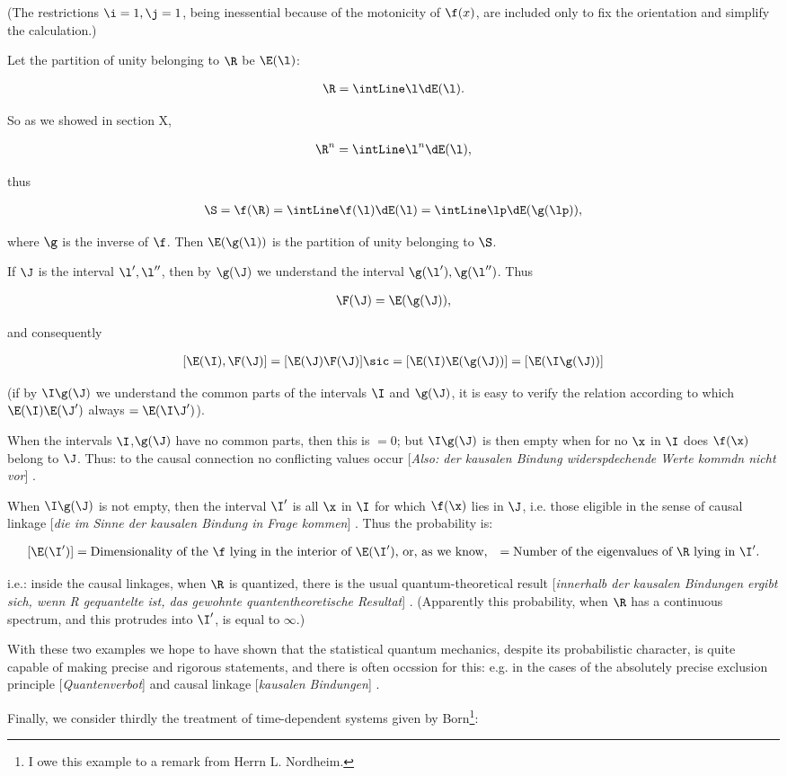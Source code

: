 \documentclass{article}
\newcommand{\WTF}[1]{
[\it{\small{#1}}]
}
\newcommand{\uequ}[1]{
\begin{align*}
#1
\end{align*}
}
\renewcommand{\it}[1]{\textit{#1}}
\begin{document}
(The restrictions $\i=1,\j=1$, being inessential because of the motonicity of $\f(x)$, are included only to fix the orientation and simplify the calculation.)

Let the partition of unity belonging to $\R$ be $\E(\l)$:
\uequ{
\R=\intLine\l\dE(\l).
}
So as we showed in section X,
\uequ{
\R^n = \intLine\l^n\dE(\l),
}
thus
\uequ{
\S=\f(\R) = \intLine\f(\l)\dE(\l) = \intLine\lp\dE(\g(\lp)),
}
where $\g$ is the inverse of $\f$. Then $\E(\g(\l))$ is the partition of unity belonging to $\S$.

If $\J$ is the interval $\l',\l''$, then by $\g(\J)$ we understand the interval $\g(\l'),\g(\l'')$. Thus
\uequ{
\F(\J)=\E(\g(\J)),
}
and consequently
\uequ{
[\E(\I),\F(\J)]=[\E(\J)\F(\J)]\sic =  [\E(\I)\E(\g(\J))] = [\E(\I\g(\J))]
}
(if by $\I\g(\J)$ we understand the common parts of the intervals $\I$ and $\g(\J)$, it is easy to verify the relation according to which $\E(\I)\E(\J')$ always $=\E(\I\J')$).

When the intervals $\I$,$\g(\J)$ have no common parts, then this is $=0$; but $\I\g(\J)$ is then empty when for no $\x$ in $\I$ does $\f(\x)$ belong to $\J$. Thus: to the causal connection no conflicting values occur\WTF{Also: der kausalen Bindung widerspdechende Werte kommdn nicht vor}.

When $\I\g(\J)$ is not empty, then the interval $\I'$ is all $\x$ in $\I$ for which $\f(\x)$ lies in $\J$, i.e. those eligible in the sense of causal linkage\WTF{die im Sinne der kausalen Bindung in Frage kommen}. Thus the probability is:
\uequ{
[\E(\I')] &= \text{Dimensionality of the $\f$ lying in the interior of $\E(\I')$, or, as we know,}
          &= \text{Number of the eigenvalues of $\R$ lying in $\I'$.}
}

i.e.: inside the causal linkages, when $\R$ is quantized, there is the usual quantum-theoretical result \WTF{innerhalb der kausalen Bindungen ergibt sich, wenn R gequantelte ist, das gewohnte quantentheoretische Resultat}. (Apparently this probability, when $\R$ has a continuous spectrum, and this protrudes into $\I'$, is equal to $\infty$.)

With these two examples we hope to have shown that the statistical quantum mechanics, despite its probabilistic character, is quite capable of making precise and rigorous statements, and there is often occssion for this: e.g. in the cases of the absolutely precise exclusion principle\WTF{Quantenverbot} and causal linkage\WTF{kausalen Bindungen}.

Finally, we consider thirdly the treatment of time-dependent systems given by Born\footnote{I owe this example to a remark from Herrn L. Nordheim.}:
\end{document}
